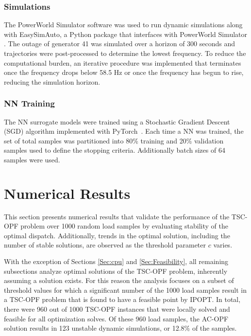 \documentclass[lettersize,journal]{IEEEtran}
\begin{document}
\subsubsection{Simulations}
The PowerWorld Simulator software was used to run dynamic simulations along with EasySimAuto, a Python package that interfaces with PowerWorld Simulator \cite{PowerWorld,ESA}. The outage of generator 41 was simulated over a horizon of 300 seconds and trajectories were post-processed to determine the lowest frequency.  To reduce the computational burden, an iterative procedure was implemented that terminates once the frequency drops below 58.5 Hz or once the frequency has begun to rise, reducing the simulation horizon.

\subsubsection{NN Training}\label{Sec:Training}
The NN surrogate models were trained using a Stochastic Gradient Descent (SGD) algorithm implemented with PyTorch~\cite{paszke2019pytorch}.  Each time a NN was trained, the set of total samples was partitioned into 80\% training and 20\% validation samples used to define the stopping criteria.  Additionally batch sizes of 64 samples were used.  


\section{Numerical Results}\label{SecIV}
This section presents numerical results that validate the performance of the TSC-OPF problem over 1000 random load samples by evaluating stability of the optimal dispatch.  Additionally, trends in the optimal solution, including the number of stable solutions, are observed as the threshold parameter $c$ varies.

With the exception of Sections \ref{Sec:cpu} and \ref{Sec:Feasibility}, all remaining subsections analyze optimal solutions of the TSC-OPF problem, inherently assuming a solution exists.  For this reason the analysis focuses on a subset of threshold values for which a significant number of the 1000 load samples result in a TSC-OPF problem that is found to have a feasible point by IPOPT. In total, there were 960 out of 1000 TSC-OPF instances that were locally solved and feasible for all optimization solves.  Of these 960 load samples, the AC-OPF solution results in 123 unstable dynamic simulations, or 12.8\% of the samples. 
\end{document}
